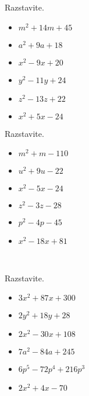 \begin{multicols}{2}
    
        
            \begin{naloga}
                Razstavite.
                \begin{itemize}
                    \item $m^2+14m+45$ 
                    \item $a^2+9a+18$ 
                    \item $x^2-9x+20$ 
                    \item $y^2-11y+24$ 
                    \item $z^2-13z+22$ 
                    \item $x^2+5x-24$ 
                \end{itemize}
            \end{naloga}
        
    
        
            \begin{naloga}
                Razstavite.
                \begin{itemize}
                    \item $m^2+m-110$ 
                    \item $u^2+9u-22$ 
                    \item $x^2-5x-24$ 
                    \item $z^2-3z-28$ 
                    \item $p^2-4p-45$ 
                    \item $x^2-18x+81$ 
                \end{itemize}
            \end{naloga}
        
            ~
    
        
            \begin{naloga}
                Razstavite.
                \begin{itemize}
                    \item $3x^2+87x+300$ 
                    \item $2y^2+18y+28$ 
                    \item $2x^2-30x+108$ 
                    \item $7a^2-84a+245$ 
                    \item $6p^5-72p^4+216p^3$ 
                    \item $2x^2+4x-70$ 
                \end{itemize}
            \end{naloga}
        

\end{multicols}
